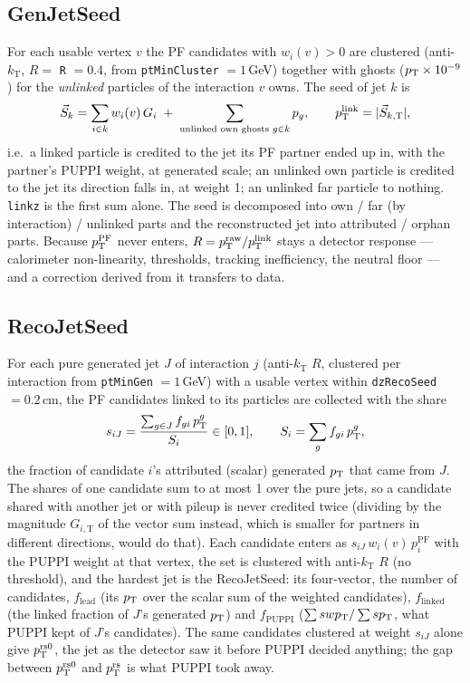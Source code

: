 \subsection{GenJetSeed}
\label{s:genjetseed}
For each usable vertex $v$ the PF candidates with $w_i(v) > 0$ are clustered
(anti-$k_{\mathrm T}$, $R = $ \texttt{R} $= 0.4$, from
\texttt{ptMinCluster} $= 1$\,GeV) together with ghosts ($p_{\mathrm{T}} \times 10^{-9}$)
for the \emph{unlinked} particles of the interaction $v$ owns. The seed of jet
$k$ is
\[
  \vec S_k = \sum_{i \in k} w_i(v)\, G_i \;+\; \sum_{\text{unlinked own ghosts } g \in k} p_g ,
  \qquad p_{\mathrm{T}}^{\mathrm{link}} = |\vec S_{k,\mathrm T}| ,
\]
i.e.\ a linked particle is credited to the jet its PF partner ended up in,
with the partner's PUPPI weight, at generated scale; an unlinked own particle
is credited to the jet its direction falls in, at weight 1; an unlinked far
particle to nothing. \texttt{linkz} is the first sum alone. The seed is
decomposed into own / far (by interaction) / unlinked parts and the
reconstructed jet into attributed / orphan parts. Because $p_{\mathrm{T}}^{\mathrm{PF}}$
never enters, $R = p_{\mathrm{T}}^{\mathrm{raw}}/p_{\mathrm{T}}^{\mathrm{link}}$ stays a detector response ---
calorimeter non-linearity, thresholds, tracking inefficiency, the neutral
floor --- and a correction derived from it transfers to data.

\subsection{RecoJetSeed}
\label{s:recojetseed}
For each pure generated jet $J$ of interaction $j$ (anti-$k_{\mathrm T}$
$R$, clustered per interaction from \texttt{ptMinGen} $= 1$\,GeV) with a
usable vertex within \texttt{dzRecoSeed} $= 0.2$\,cm, the PF candidates linked
to its particles are collected with the share
\[
  s_{iJ} = \frac{\sum_{g \in J} f_{gi}\, p_{\mathrm{T}}^g}{S_i} \in [0,1] ,
  \qquad S_i = \sum_g f_{gi}\, p_{\mathrm{T}}^g ,
\]
the fraction of candidate $i$'s attributed (scalar) generated $p_{\mathrm{T}}$ that came
from $J$. The shares of one candidate sum to at most 1 over the pure jets, so
a candidate shared with another jet or with pileup is never credited twice
(dividing by the magnitude $G_{i,\mathrm T}$ of the vector sum instead, which is
smaller for partners in different directions, would do that). Each candidate
enters as $s_{iJ}\, w_i(v)\, p_i^{\mathrm{PF}}$ with the PUPPI weight at that
vertex, the set is clustered with anti-$k_{\mathrm T}$ $R$ (no threshold), and the hardest
jet is the RecoJetSeed: its four-vector, the number of candidates,
$f_{\mathrm{lead}}$ (its $p_{\mathrm{T}}$ over the scalar sum of the weighted candidates),
$f_{\mathrm{linked}}$ (the linked fraction of $J$'s generated $p_{\mathrm{T}}$) and
$f_{\mathrm{PUPPI}}$ ($\sum s w p_{\mathrm{T}} / \sum s p_{\mathrm{T}}$, what PUPPI kept of $J$'s
candidates). The same candidates clustered at weight $s_{iJ}$ alone give
$p_{\mathrm{T}}^{\mathrm{rs0}}$, the jet as the detector saw it before PUPPI decided
anything; the gap between $p_{\mathrm{T}}^{\mathrm{rs0}}$ and $p_{\mathrm{T}}^{\mathrm{rs}}$ is what PUPPI took
away.

